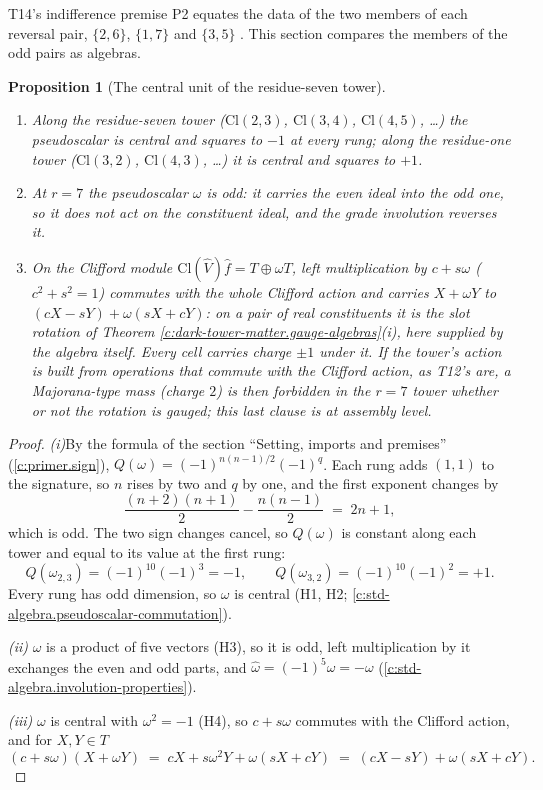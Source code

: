 \documentclass[11pt]{article}
\newtheorem{proposition}[theorem]{Proposition}
\theoremstyle{definition}
\theoremstyle{plain}
\newcommand{\changedmark}[2]{\marginpar{\raggedright\scriptsize\color{#1}#2}}
\providecommand{\Cl}{}\renewcommand{\Cl}{\mathrm{Cl}}
\providecommand{\hatV}{}\renewcommand{\hatV}{\widehat{V}}
\providecommand{\hf}{}\renewcommand{\hf}{\hat{f}}
\begin{document}
\label{c:note.dark-tower-matter.setting-paired-towers}
T14's indifference premise P2 equates the data of the two members of each reversal pair, $\{2, 6\}$, $\{1, 7\}$ and $\{3, 5\}$ \cite[Prem.~2.2]{ButlerT14}. This section compares the members of the odd pairs as algebras.

\begin{proposition}[The central unit of the residue-seven tower]\label{c:dark-tower-matter.residue-seven-unit}
\changedmark{gray}{reworded}
\begin{enumerate}
\item[(i)] Along the residue-seven tower ($\Cl(2,3)$, $\Cl(3,4)$, $\Cl(4,5)$, \ldots) the pseudoscalar is central and squares to $-1$ at every rung; along the residue-one tower ($\Cl(3,2)$, $\Cl(4,3)$, \ldots) it is central and squares to $+1$.
\item[(ii)] At $r = 7$ the pseudoscalar $\omega$ is odd: it carries the even ideal into the odd one, so it does not act on the constituent ideal, and the grade involution reverses it.
\item[(iii)] On the Clifford module $\Cl(\hatV)\hf = T \oplus \omega T$, left multiplication by $c + s\omega$ ($c^{2} + s^{2} = 1$) commutes with the whole Clifford action and carries $X + \omega Y$ to $(cX - sY) + \omega(sX + cY)$: on a pair of real constituents it is the slot rotation of Theorem \ref{c:dark-tower-matter.gauge-algebras}(i), here supplied by the algebra itself. Every cell carries charge $\pm 1$ under it. If the tower's action is built from operations that commute with the Clifford action, as T12's are, a Majorana-type mass (charge $2$) is then forbidden in the $r = 7$ tower whether or not the rotation is gauged; this last clause is at assembly level.
\end{enumerate}
\end{proposition}
\begin{proof}
\textit{(i)}\enspace By the formula of the section ``Setting, imports and premises'' (\ref{c:primer.sign}), $Q(\omega) = (-1)^{n(n-1)/2}(-1)^{q}$. Each rung adds $(1,1)$ to the signature, so $n$ rises by two and $q$ by one, and the first exponent changes by
\[
\frac{(n+2)(n+1)}{2} - \frac{n(n-1)}{2} \;=\; 2n + 1,
\]
which is odd. The two sign changes cancel, so $Q(\omega)$ is constant along each tower and equal to its value at the first rung:
\[
Q(\omega_{2,3}) = (-1)^{10}(-1)^{3} = -1, \qquad Q(\omega_{3,2}) = (-1)^{10}(-1)^{2} = +1.
\]
Every rung has odd dimension, so $\omega$ is central (H1, H2; \ref{c:std-algebra.pseudoscalar-commutation}).



\emph{(ii)}  $\omega$ is a product of five vectors (H3), so it is odd, left multiplication by it exchanges the even and odd parts, and $\hat{\omega} = (-1)^{5}\omega = -\omega$ (\ref{c:std-algebra.involution-properties}).



\emph{(iii)}  $\omega$ is central with $\omega^{2} = -1$ (H4), so $c + s\omega$ commutes with the Clifford action, and for $X, Y \in T$
\[
(c + s\omega)(X + \omega Y) \;=\; cX + s\omega^{2}Y + \omega(sX + cY) \;=\; (cX - sY) + \omega(sX + cY).
\]

\end{proof}
\end{document}
